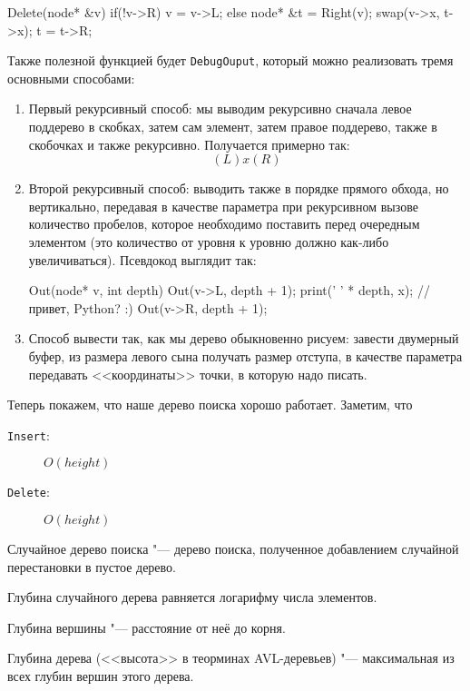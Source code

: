 \begin{cppcode}
Delete(node* &v) {
	if(!v->R)
		v = v->L;
	else {
		node* &t = Right(v);
		swap(v->x, t->x);
		t = t->R;
	}
}
\end{cppcode}
Также полезной функцией будет \texttt{DebugOuput}, который можно реализовать тремя основными способами:
\begin{enumerate}
\item
	Первый рекурсивный способ: мы выводим рекурсивно сначала левое поддерево в скобках,
	затем сам элемент, затем правое поддерево, также в скобочках и также рекурсивно.
	Получается примерно так:
	\[ (L) x (R) \]
\item
	Второй рекурсивный способ: выводить также в порядке прямого обхода, но вертикально,
	передавая в качестве параметра при рекурсивном вызове количество пробелов, 
	которое необходимо поставить перед очередным элементом 
	(это количество от уровня к уровню должно как-либо увеличиваться). 
	Псевдокод выглядит так:
\begin{cppcode}
Out(node* v, int depth) {
	Out(v->L, depth + 1);
	print(' ' * depth, x); //привет, Python? :)
	Out(v->R, depth + 1);
}
\end{cppcode}
\item 
	Способ вывести так, как мы дерево обыкновенно рисуем: завести двумерный буфер, 
	из размера левого сына получать размер отступа, в качестве параметра 
	передавать <<координаты>> точки, в которую надо писать.
\end{enumerate}

Теперь покажем, что наше дерево поиска хорошо работает. Заметим, что
\begin{description}
	\item[\texttt{Insert}:] $O(height)$
	\item[\texttt{Delete}:] $O(height)$
\end{description}

\begin{Def}
	Случайное дерево поиска "--- дерево поиска, полученное добавлением 
	случайной перестановки в пустое дерево.
\end{Def}

\begin{Def}
	Глубина случайного дерева равняется логарифму числа элементов.
\end{Def}
\begin{Def}
	Глубина вершины "--- расстояние от неё до корня.
\end{Def}
\begin{Def}
	Глубина дерева (<<высота>> в теорминах AVL-деревьев) "--- максимальная из всех глубин
	вершин этого дерева.
\end{Def}

